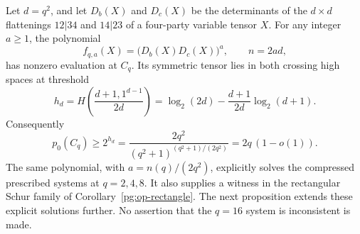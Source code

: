 \begin{proposition}
\label{pg:op-determinant}
Let $d=q^2$, and let $D_b(X)$ and $D_c(X)$ be the determinants of the
$d\times d$ flattenings $12|34$ and $14|23$ of a four-party variable
tensor $X$. For any integer $a\geq1$, the polynomial
\[
 f_{q,a}(X)=\bigl(D_b(X)D_c(X)\bigr)^a,
 \qquad n=2ad,
 \tag{PG-OP-det-vector}
\]
has nonzero evaluation at $C_q$. Its symmetric tensor lies in both
crossing high spaces at threshold
\[
 h_d=H\!\left(\frac{d+1,1^{d-1}}{2d}\right)
     =\log_2(2d)-\frac{d+1}{2d}\log_2(d+1).
 \tag{PG-OP-det-entropy}
\]
Consequently
\[
 p_0(C_q)\geq 2^{h_d}
          =\frac{2q^2}{(q^2+1)^{(q^2+1)/(2q^2)}}
          =2q\,(1-o(1)).
\]
The same polynomial, with $a=n(q)/(2q^2)$, explicitly solves the
compressed prescribed systems at $q=2,4,8$. It also supplies a witness
in the rectangular Schur family of Corollary~\ref{pg:op-rectangle}.
The next proposition extends these explicit solutions further. No
assertion that the $q=16$ system is inconsistent is made.
\end{proposition}
